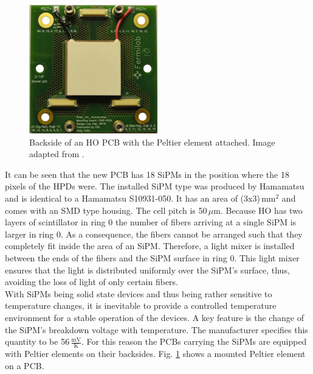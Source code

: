 \begin{figure}[h]
\begin{minipage}[t]{0.435\textwidth}
\includegraphics[width=\textwidth]{Figures/kuensken/pcbPeltier.png}
\caption{Backside of an HO PCB with the Peltier element attached. Image adapted from \cite{beniCalor}.}
\label{kuenskenpeltier}
\end{minipage}
\end{figure}
It can be seen that the new PCB has 18 SiPMs in the position where the 18 pixels of the HPDs were.
The installed SiPM type was produced by Hamamatsu and is identical to a Hamamatsu S10931-050. It has an area of (3x3)\,mm$^2$ and comes with an SMD type housing. The cell pitch is 50\,$\mu$m.
Because HO has two layers of scintillator in ring 0 the number of fibers arriving at a single SiPM is larger in ring 0. As a consequence, the fibers cannot be arranged such that they completely fit inside the area of an SiPM. Therefore, a light mixer is installed between the ends of the fibers and the SiPM surface in ring 0. This light mixer
ensures that the light is distributed uniformly over the SiPM's surface, thus, avoiding the loss of light of only certain fibers.\\
With SiPMs being solid state devices and thus being rather sensitive to temperature changes, it is inevitable to provide a controlled temperature environment for a stable operation of the devices. A key feature is the change of the SiPM's breakdown voltage with temperature. The manufacturer specifies this quantity to be 56\,$\frac{\text{mV}}{\text{K}}$. For this reason the PCBs carrying the SiPMs are equipped with Peltier elements on their backsides. Fig. \ref{kuenskenpeltier} shows a mounted Peltier element on a PCB.
